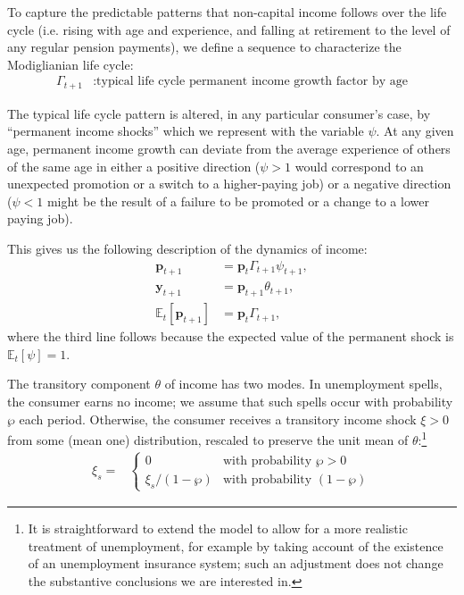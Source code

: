 \documentclass{article}
\newcommand{\yLvl}{\mathbf{y}}
\newcommand{\pLvl}{\mathbf{p}}
\newcommand{\Ex}{\mathbb{E}}
\newcommand{\permGroFac}{\Gamma}
\newcommand{\permShk}{\psi}
\newcommand{\tranShk}{\theta}
\newcommand{\pZero}{\wp}
\newcommand{\tranShkEmp}{\xi}
\begin{document}
To capture the predictable patterns that non-capital income follows over the life cycle (i.e. rising with age and experience, and falling at retirement to the level of any regular pension payments), we define a sequence to characterize the Modiglianian life cycle:
\begin{align}
    \permGroFac_{t+1} & : \text{typical life cycle permanent income growth factor by age}
\end{align}

The typical life cycle pattern is altered, in any particular consumer's case, by ``permanent income shocks'' which we represent with the variable $\permShk$.
At any given age, permanent income growth can deviate from the average experience of others of the same age in either a positive direction ($\psi>1$ would correspond to an unexpected promotion or a switch to a higher-paying job) or a negative direction ($\psi < 1$ might be the result of a failure to be promoted or a change to a lower paying job).

This gives us the following description of the dynamics of income:
\begin{align}
    \pLvl_{t+1} & = \pLvl_{t} \permGroFac_{t+1} \permShk_{t+1}, \\
    \yLvl_{t+1} & = \pLvl_{t+1} \tranShk_{t+1}, \\
    \Ex_{t}[\pLvl_{t+1}] & = \pLvl_{t} \permGroFac_{t+1},
\end{align}
where the third line follows because the expected value of the permanent shock is $\Ex_{t}[\permShk]=1$.

The transitory component $\tranShk$ of income has two modes.
In unemployment spells, the consumer earns no income; we assume that such spells occur with probability $\pZero$ each period.
Otherwise, the consumer receives a transitory income shock $\xi > 0$ from some (mean one) distribution, rescaled to preserve the unit mean of $\tranShk$:\footnote{It is straightforward to extend the model to allow for a more realistic treatment of unemployment, for example by taking account of the existence of an unemployment insurance system; such an adjustment does not change the substantive conclusions we are interested in.}
\begin{align}
    \tranShkEmp_{s} = &
    \begin{cases}
        0\phantom{/\pZero} & \text{with probability $\pZero>0$}
        \\ \xi_{s}/(1-\pZero) & \text{with probability $(1-\pZero)$}
    \end{cases}
\end{align}
\end{document}
